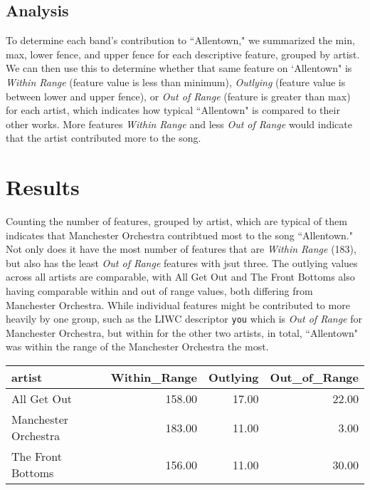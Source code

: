 \documentclass{article}\usepackage[]{graphicx}\usepackage[]{xcolor}
\newenvironment{Figure}
  {\par\medskip\noindent\minipage{\linewidth}}
  {\endminipage\par\medskip}
\begin{document}
\begin{multicols}{2}
\subsection{Analysis}
To determine each band's contribution to ``Allentown," we summarized the min, max, lower fence, and upper fence for each descriptive feature, grouped by artist. We can then use this to determine whether that same feature on `Allentown" is \emph{Within Range} (feature value is less than minimum), \emph{Outlying} (feature value is between lower and upper fence), or \emph{Out of Range} (feature is greater than max) for each artist, which indicates how typical ``Allentown" is compared to their other works. More features \emph{Within Range} and less \emph{Out of Range} would indicate that the artist contributed more to the song. 


\section{Results}
Counting the number of features, grouped by artist, which are typical of them indicates that Manchester Orchestra contribtued most to the song ``Allentown." Not only does it have the most number of features that are \emph{Within Range} (183), but also has the least \emph{Out of Range} features with jsut three. The outlying values across all artists are comparable, with All Get Out and The Front Bottoms also having comparable within and out of range values, both differing from Manchester Orchestra. While individual features might be contributed to more heavily by one group, such as the LIWC descriptor \texttt{you} which is \emph{Out of Range} for Manchester Orchestra, but within for the other two artists, in total, ``Allentown" was within the range of the Manchester Orchestra the most.

\begin{Figure}
\centering
\begin{footnotesize}
\begin{tabular}{lrrr}
  \hline
  artist & Within\_Range & Outlying & Out\_of\_Range \\ 
  \hline
   All Get Out & 158.00 & 17.00 & 22.00 \\ 
   Manchester Orchestra & 183.00 & 11.00 & 3.00 \\ 
   The Front Bottoms & 156.00 & 11.00 & 30.00 \\ 
   \hline
\end{tabular}
\end{footnotesize}
\end{Figure}



\end{multicols}
\end{document}
